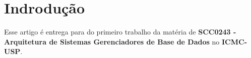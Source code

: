 \section{Indrodução}

Esse artigo é entrega para do primeiro trabalho da matéria de \textbf{SCC0243 - Arquitetura de Sistemas Gerenciadores de Base de Dados} no \textbf{ICMC-USP}.
